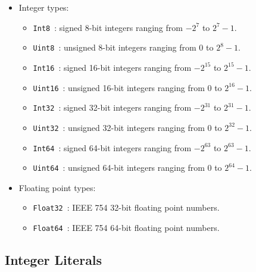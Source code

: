\documentclass{article}
\renewcommand{\sec}[1]{\label{sec:#1}}
\begin{document}
\begin{itemize}
  \item Integer types:
  \begin{itemize}
    \item \verb|Int8|~: signed 8-bit integers ranging from $-2^7$ to $2^7-1$.
    \item \verb|Uint8|~: unsigned 8-bit integers ranging from 0 to $2^8-1$.
    \item \verb|Int16|~: signed 16-bit integers ranging from $-2^{15}$ to $2^{15}-1$.
    \item \verb|Uint16|~: unsigned 16-bit integers ranging from 0 to $2^{16}-1$.
    \item \verb|Int32|~: signed 32-bit integers ranging from $-2^{31}$ to $2^{31}-1$.
    \item \verb|Uint32|~: unsigned 32-bit integers ranging from 0 to $2^{32}-1$.
    \item \verb|Int64|~: signed 64-bit integers ranging from $-2^{63}$ to $2^{63}-1$.
    \item \verb|Uint64|~: unsigned 64-bit integers ranging from 0 to $2^{64}-1$.
  \end{itemize}
  \item Floating point types:
  \begin{itemize}
    \item \verb|Float32|~: IEEE 754 32-bit floating point numbers.
    \item \verb|Float64|~: IEEE 754 64-bit floating point numbers.
  \end{itemize}
\end{itemize}

\subsection{Integer Literals}\sec{integer-literals}
\end{document}
